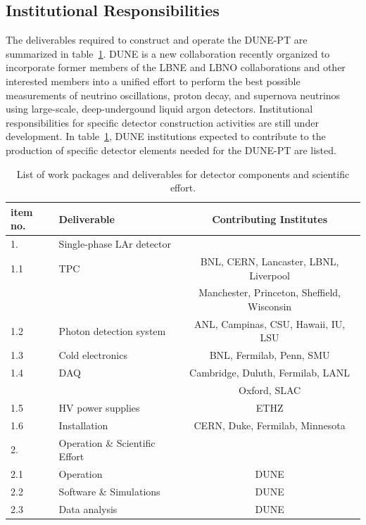 \subsection{Institutional Responsibilities}

The deliverables required to construct and operate the DUNE-PT are summarized in table~\ref{tab:wbs-detector}.  DUNE is a new collaboration 
recently organized to incorporate former members of the LBNE and LBNO collaborations and other interested members into a unified 
effort to perform the best possible measurements of neutrino oscillations, proton decay, and supernova neutrinos using large-scale, 
deep-undergound liquid argon detectors.  Institutional responsibilities for specific detector construction activities are still 
under development.  In table~\ref{tab:wbs-detector}, DUNE institutions expected to contribute to the production of specific detector elements 
needed for the DUNE-PT are listed. 
%
\begin{table}[h]
\centering
\begin{tabular}{|l l c|}
\hline
\textbf{item no. } & \textbf{Deliverable}  & \textbf{Contributing Institutes}  \\ \hline

1.   & Single-phase LAr detector & \\
1.1  & TPC & BNL, CERN, Lancaster, LBNL, Liverpool \\
  &  & Manchester, Princeton, Sheffield, Wisconsin \\
1.2  & Photon detection system  &  ANL, Campinas, CSU, Hawaii, IU, LSU \\
1.3  & Cold electronics  & BNL, Fermilab, Penn, SMU \\ 
1.4  & DAQ & Cambridge, Duluth,  Fermilab, LANL \\
       &          & Oxford, SLAC \\
1.5  & HV power supplies  &  ETHZ \\
1.6  & Installation & CERN, Duke, Fermilab, Minnesota \\ \hline
2.   & Operation \& Scientific Effort & \\ 
2.1 & Operation & DUNE \\
2.2  & Software \& Simulations &  DUNE \\
2.3  & Data analysis &  DUNE \\ \hline

\end{tabular}
\caption{List of work packages and deliverables for detector components and scientific effort.} 
\label{tab:wbs-detector}
\end{table}
